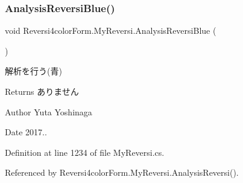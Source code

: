 \subsubsection{\texorpdfstring{Analysis\+Reversi\+Blue()}{AnalysisReversiBlue()}}
{\footnotesize\ttfamily void Reversi4color\+Form.\+My\+Reversi.\+Analysis\+Reversi\+Blue (\begin{DoxyParamCaption}{ }\end{DoxyParamCaption})\hspace{0.3cm}{\ttfamily [private]}}



解析を行う(青) 

\begin{DoxyReturn}{Returns}
ありません 
\end{DoxyReturn}
\begin{DoxyAuthor}{Author}
Yuta Yoshinaga 
\end{DoxyAuthor}
\begin{DoxyDate}{Date}
2017.. 
\end{DoxyDate}


Definition at line 1234 of file My\+Reversi.\+cs.



Referenced by Reversi4color\+Form.\+My\+Reversi.\+Analysis\+Reversi().

